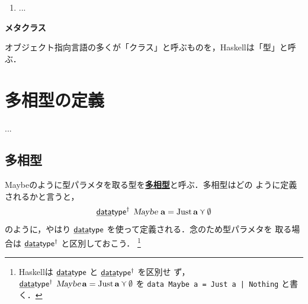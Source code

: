 \documentclass[a5paper,twoside,fleqn,draft]{jsbook}
\def\[{[\![}
\def\]{]\!]}
\newcommand{\programminglanguage}[1]{\textsf{#1}}
\newcommand{\haskell}{\programminglanguage{Haskell}}
\newenvironment{note}[1]{\begin{boxnote}\begin{center}\textbf{#1}\end{center}}{\end{boxnote}}
\newcommand{\keyword}[1]{{\underline{\textbf{#1}}}}
\newcommand{\code}[1]{\texttt{#1}}
\newcommand{\mKeyword}[1]{\mathsf{#1}}
\newcommand{\mKeywordUnderline}[1]{\text{\underline{\textsf{#1}}}}
\newcommand{\mDataTypeKeyword}{\mKeywordUnderline{data}\mKeyword{type}}
\DeclareMathOperator{\mDataType}{\mDataTypeKeyword}
\DeclareMathOperator{\mDataTypePolymorphic}{\mDataTypeKeyword^\dagger}
\newcommand{\mNothing}{\emptyset}
\DeclareMathOperator{\mValueOr}{\curlyvee}
\newcommand{\mType}[1]{\mathbf{#1}} %
\newcommand{\mA}{\mType{a}}
\newcommand{\mTypeAssemble}[2]{{}^\mType{#1}\[\mType{#2}\]}
\newcommand{\mMaybeType}[1]{\mTypeAssemble{M}{#1}}
\newcommand{\mTypeConstructor}[1]{\textsl{#1}}
\DeclareMathOperator{\mMaybeTypeConstructor}{\mTypeConstructor{Maybe}}
\newcommand{\mValueConstructor}[1]{\mathrm{#1}}
\newcommand{\mValueWith}[2]{\mValueConstructor{#1}\,#2}
\newcommand{\mJustWith}[1]{\mValueWith{Just}{#1}}
\begin{document}
\begin{enumerate}
\item ...
\end{enumerate}

\begin{note}{メタクラス}
オブジェクト指向言語の多くが「クラス」と呼ぶものを，\haskell は「型」と呼ぶ．


\end{note}


\chapter{多相型の定義}
\label{ch:polymorphic-data-type}
...

\section{多相型}

Maybeのように型パラメタを取る型を\keyword{多相型}と呼ぶ．多相型はどの
ように定義されるかと言うと，
\begin{equation}
  \mDataTypePolymorphic\;
  \mMaybeTypeConstructor\,\mA
  =\mJustWith{\mA}\mValueOr\mNothing
\end{equation}
のように，やはり $\mDataType$ を使って定義される．念のため型パラメタを
取る場合は $\mDataTypePolymorphic$ と区別しておこう．
\footnote{\haskell は $\mDataType$ と $\mDataTypePolymorphic$ を区別せ
  ず，$\mDataTypePolymorphic\;\mMaybeTypeConstructor\mA
  =\mJustWith{\mA }\mValueOr\mNothing$ を \code{data Maybe a = Just a
    | Nothing} と書く．}
\end{document}
